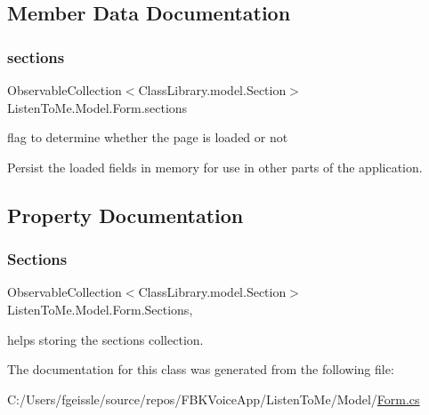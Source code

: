 \subsection{Member Data Documentation}
\mbox{\label{class_listen_to_me_1_1_model_1_1_form_a4b5d6fd20dc2522f3ad05614958c9895}} 
\subsubsection{\texorpdfstring{sections}{sections}}
{\footnotesize\ttfamily Observable\+Collection$<$Class\+Library.\+model.\+Section$>$ Listen\+To\+Me.\+Model.\+Form.\+sections\hspace{0.3cm}{\ttfamily [private]}}



flag to determine whether the page is loaded or not 

Persist the loaded fields in memory for use in other parts of the application. 

\subsection{Property Documentation}
\mbox{\label{class_listen_to_me_1_1_model_1_1_form_a5ecdd2a344e3e2e6157ff3c5b6dfc2d1}} 
\subsubsection{\texorpdfstring{Sections}{Sections}}
{\footnotesize\ttfamily Observable\+Collection$<$Class\+Library.\+model.\+Section$>$ Listen\+To\+Me.\+Model.\+Form.\+Sections\hspace{0.3cm}{\ttfamily [get]}, {\ttfamily [set]}}



helps storing the sections collection. 



The documentation for this class was generated from the following file\+:\begin{DoxyCompactItemize}
\item 
C\+:/\+Users/fgeissle/source/repos/\+F\+B\+K\+Voice\+App/\+Listen\+To\+Me/\+Model/\mbox{\hyperlink{_form_8cs}{Form.\+cs}}\end{DoxyCompactItemize}
